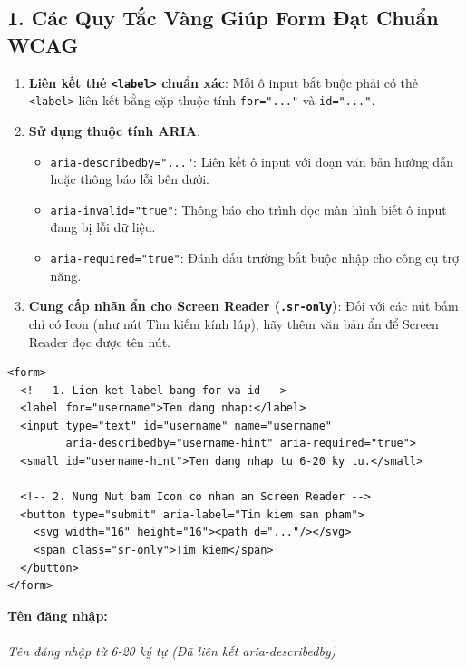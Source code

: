 \documentclass[11pt,oneside]{book}
\newcommand{\codeinline}[1]{\textcolor{accentOrange}{\texttt{#1}}}
\begin{document}
\subsection{1. Các Quy Tắc Vàng Giúp Form Đạt Chuẩn WCAG}
\begin{enumerate}[leftmargin=1.5em, itemsep=4pt, parsep=0pt]
    \item \textbf{Liên kết thẻ \codeinline{<label>} chuẩn xác}: Mỗi ô input bắt buộc phải có thẻ \codeinline{<label>} liên kết bằng cặp thuộc tính \codeinline{for="..."} và \codeinline{id="..."}.
    \item \textbf{Sử dụng thuộc tính ARIA}:
    \begin{itemize}[leftmargin=1.2em, itemsep=2pt]
        \item \codeinline{aria-describedby="..."}: Liên kết ô input với đoạn văn bản hướng dẫn hoặc thông báo lỗi bên dưới.
        \item \codeinline{aria-invalid="true"}: Thông báo cho trình đọc màn hình biết ô input đang bị lỗi dữ liệu.
        \item \codeinline{aria-required="true"}: Đánh dấu trường bắt buộc nhập cho công cụ trợ năng.
    \end{itemize}
    \item \textbf{Cung cấp nhãn ẩn cho Screen Reader (\codeinline{.sr-only})}: Đối với các nút bấm chỉ có Icon (như nút Tìm kiếm kính lúp), hãy thêm văn bản ẩn để Screen Reader đọc được tên nút.
\end{enumerate}

\begin{codeWindow}
\begin{lstlisting}[language=HTML5]
<form>
  <!-- 1. Lien ket label bang for va id -->
  <label for="username">Ten dang nhap:</label>
  <input type="text" id="username" name="username" 
         aria-describedby="username-hint" aria-required="true">
  <small id="username-hint">Ten dang nhap tu 6-20 ky tu.</small>
  
  <!-- 2. Nung Nut bam Icon co nhan an Screen Reader -->
  <button type="submit" aria-label="Tim kiem san pham">
    <svg width="16" height="16"><path d="..."/></svg>
    <span class="sr-only">Tim kiem</span>
  </button>
</form>
\end{lstlisting}
\end{codeWindow}

\begin{browserWindow}
\sffamily\small
\textbf{Tên đăng nhập:}\\[2pt]
 \\[2pt]
\textcolor{gray!70}{\small\textit{Tên đăng nhập từ 6-20 ký tự (Đã liên kết aria-describedby)}}\\[8pt]
\end{browserWindow}
\end{document}

